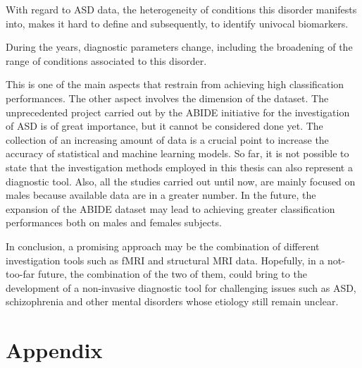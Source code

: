 \documentclass[11pt]{report}
\begin{document}
With regard to ASD data, the heterogeneity of conditions this disorder manifests into, makes it hard to define and subsequently, to identify univocal biomarkers.

During the years, diagnostic parameters change, including the broadening of the range of conditions associated to this disorder.

This is one of the main aspects that restrain from achieving high classification performances.
The other aspect involves the dimension of the dataset.
The unprecedented project carried out by the ABIDE initiative for the investigation of ASD is of great importance, but it cannot be considered done yet.
The collection of an increasing amount of data is a crucial point to increase the accuracy of statistical and machine learning models.
So far, it is not possible to state that the investigation methods employed in this thesis can also represent a diagnostic tool.
Also, all the studies carried out until now, are mainly focused on males because available data are in a greater number. 
In the future, the expansion of the ABIDE dataset may lead to achieving greater classification performances both on males and females subjects.

In conclusion, a promising approach may be the combination of different investigation tools such as fMRI and structural MRI data.
Hopefully, in a not-too-far future, the combination of the two of them, could bring to the development of a non-invasive diagnostic tool for challenging issues such as ASD, schizophrenia and other mental disorders whose etiology still remain unclear. 


 

\newpage

\chapter*{Appendix}
\appendix
\end{document}
